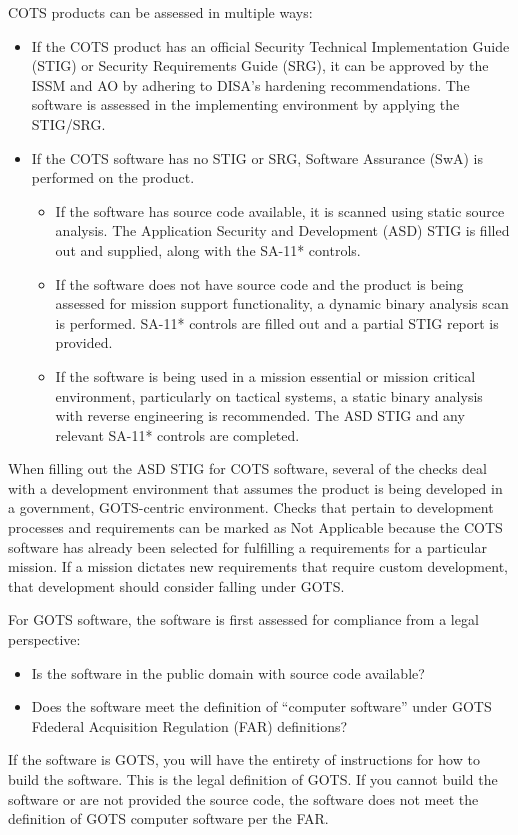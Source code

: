 COTS products can be assessed in multiple ways:
\begin{itemize}
	\item If the COTS product has an official Security Technical Implementation Guide (STIG) or Security Requirements Guide (SRG), it can be approved by the ISSM and AO by adhering to DISA's hardening recommendations. The software is assessed in the implementing environment by applying the STIG/SRG.
	\item If the COTS software has no STIG or SRG, Software Assurance (SwA) is performed on the product.
	\begin{itemize}
		\item If the software has source code available, it is scanned using static source analysis. The Application Security and Development (ASD) STIG is filled out and supplied, along with the SA-11* controls.
		\item If the software does not have source code and the product is being assessed for mission support functionality, a dynamic binary analysis scan is performed. SA-11* controls are filled out and a partial STIG report is provided.
		\item If the software is being used in a mission essential or mission critical environment, particularly on tactical systems, a static binary analysis with reverse engineering is recommended. The ASD STIG and any relevant SA-11* controls are completed.
	\end{itemize}
\end{itemize}

When filling out the ASD STIG for COTS software, several of the checks deal with a development environment that assumes the product is being developed in a government, GOTS-centric environment. Checks that pertain to development processes and requirements can be marked as Not Applicable because the COTS software has already been selected for fulfilling a requirements for a particular mission. If a mission dictates new requirements that require custom development, that development should consider falling under GOTS.

For GOTS software, the software is first assessed for compliance from a legal perspective:
\begin{itemize}
	\item Is the software in the public domain with source code available?
	\item Does the software meet the definition of ``computer software'' under GOTS Fdederal Acquisition Regulation (FAR) definitions?
\end{itemize}
If the software is GOTS, you will have the entirety of instructions for how to build the software. This is the legal definition of GOTS. If you cannot build the software or are not provided the source code, the software does not meet the definition of GOTS computer software per the FAR.

